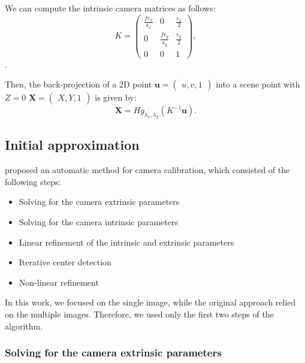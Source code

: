 We can compute the intrinsic camera matrices as follows:
\begin{equation}
	K = \begin{pmatrix}
		\frac{f r_x}{s_x} & 0                 & \frac{r_x}{2} \\
		0                 & \frac{f r_y}{s_y} & \frac{r_y}{2} \\
		0                 & 0                 & 1
	\end{pmatrix},
\end{equation}.

Then, the back-projection of a 2D point \(\mathbf{u} = \begin{pmatrix}
	u, v, 1
\end{pmatrix}\) into a scene point with \(Z = 0\) \(\mathbf{X} = \begin{pmatrix}
	X, Y, 1
\end{pmatrix}\) is given by:
\begin{equation}
	\mathbf{X} = H g_{\lambda_1, \lambda_2}(K^{-1} \mathbf{u}).
\end{equation}

\subsection{Initial approximation}\label{sub:initial_approximation}

\cite{scaramuzzaToolboxEasilyCalibrating2006} proposed an automatic method for
camera calibration, which consisted of the following steps:
\begin{itemize}
	\item Solving for the camera extrinsic parameters
	\item Solving for the camera intrinsic parameters
	\item Linear refinement of the intrinsic and extrinsic parameters
	\item Iterative center detection
	\item Non-linear refinement
\end{itemize}

In this work, we focused on the single image, while the original approach relied
on the multiple images. Therefore, we used only the first two steps of the
algorithm.

\subsubsection{Solving for the camera extrinsic parameters}\label{ssub:solving_for_the_camera_extrinsic_parameters}

